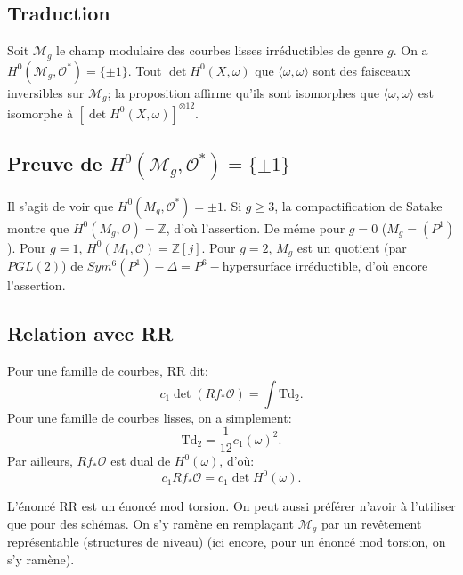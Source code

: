\documentclass[11pt,a4paper]{article}
\theoremstyle{plain}
\theoremstyle{definition}
\newcommand{\Z}{\mathbb{Z}}
\newcommand{\cO}{\mathcal{O}}
\begin{document}
\subsection{Traduction}
Soit $\mathcal{M}_g$ le champ modulaire des courbes lisses irr\'eductibles de genre $g$. On a $H^0(\mathcal{M}_g, \cO^*) = \{\pm 1\}$. Tout $\det H^0(X, \omega)$ que $\langle \omega, \omega \rangle$ sont des faisceaux inversibles sur $\mathcal{M}_g$; la proposition affirme qu'ils sont isomorphes que $\langle \omega, \omega \rangle$ est isomorphe \`a $[\det H^0(X, \omega)]^{\otimes 12}$.

\subsection{Preuve de $H^0(\mathcal{M}_g, \cO^*) = \{\pm 1\}$}
Il s'agit de voir que $H^0(M_g, \cO^*) = \pm 1$. Si $g \geq 3$, la compactification de Satake montre que $H^0(M_g, \cO) = \Z$, d'o\`u l'assertion. De m\'eme pour $g = 0$ ($M_g = (P^1)$). Pour $g = 1$, $H^0(M_1, \cO) = \Z[j]$. Pour $g = 2$, $M_g$ est un quotient (par $PGL(2)$) de $Sym^6(P^1) - \Delta = P^6 - \text{hypersurface irr\'eductible}$, d'o\`u encore l'assertion.

\subsection{Relation avec RR}
Pour une famille de courbes, RR dit:
\begin{equation}
c_1 \det(Rf_* \cO) = \int \mathrm{Td}_2.
\end{equation}
Pour une famille de courbes lisses, on a simplement:
\begin{equation}
\mathrm{Td}_2 = \frac{1}{12} c_1(\omega)^2.
\end{equation}
Par ailleurs, $Rf_* \cO$ est dual de $H^0(\omega)$, d'o\`u:
\begin{equation}
c_1 Rf_* \cO = c_1 \det H^0(\omega).
\end{equation}

L'\'enonc\'e RR est un \'enonc\'e mod torsion. On peut aussi pr\'ef\'erer n'avoir \`a l'utiliser que pour des sch\'emas. On s'y ram\`ene en rempla\c{c}ant $\mathcal{M}_g$ par un rev\^etement repr\'esentable (structures de niveau) (ici encore, pour un \'enonc\'e mod torsion, on s'y ram\`ene).
\end{document}
